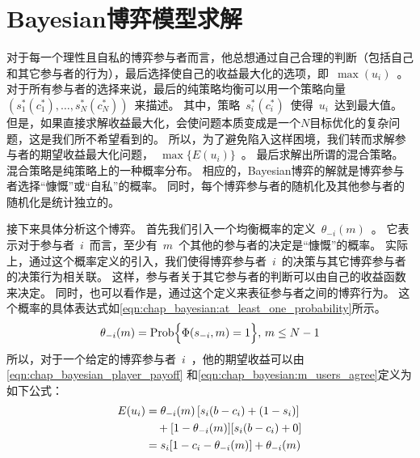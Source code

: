 %
\section{Bayesian博弈模型求解}
对于每一个理性且自私的博弈参与者而言，他总想通过自己合理的判断（包括自己和其它参与者的行为），最后选择使自己的收益最大化的选项，即~$\max(u_i)$~。
对于所有参与者的选择来说，最后的纯策略均衡可以用一个策略向量~$( s_1^*(c_1^*),\ldots, s_N^*(c_N^*) )$~来描述。
其中，策略~$s_i^*(c_i^*)$~使得~$u_i$~达到最大值。
但是，如果直接求解收益最大化，会使问题本质变成是一个$N$目标优化的复杂问题，这是我们所不希望看到的。
所以，为了避免陷入这样困境，我们转而求解参与者的期望收益最大化问题，~$\max\{E(u_i)\}$~。
最后求解出所谓的混合策略。混合策略是纯策略上的一种概率分布。
相应的，Bayesian博弈的解就是博弈参与者选择“慷慨”或“自私”的概率。
同时，每个博弈参与者的随机化及其他参与者的随机化是统计独立的。

接下来具体分析这个博弈。
首先我们引入一个均衡概率的定义~$\theta_{-i}(m)$~。
它表示对于参与者~$i$~而言，至少有~$m$~个其他的参与者的决定是“慷慨”的概率。
实际上，通过这个概率定义的引入，我们使得博弈参与者~$i$~的决策与其它博弈参与者的决策行为相关联。
这样，参与者关于其它参与者的判断可以由自己的收益函数来决定。
同时，也可以看作是，通过这个定义来表征参与者之间的博弈行为。
这个概率的具体表达式如\eqref{eqn:chap_bayesian:at_least_one_probability}所示。
\begin{equation}
    \theta_{-i}(m) = \hbox{Prob} \Bigl\{ \Phi( s_{-i},m) = 1 \Bigr\}, \, m\le N-1
    \label{eqn:chap_bayesian:at_least_one_probability} 
\end{equation}
所以，对于一个给定的博弈参与者~$i$~，他的期望收益可以由\eqref{eqn:chap_bayesian_player_payoff} 
和\eqref{eqn:chap_bayesian:m_users_agree}定义为如下公式：
\begin{align}
     E(u_i) &= \theta_{-i}(m)\left[s_i(b-c_i) +(1-s_i)\right] \notag \\
     & \quad + [1-\theta_{-i}(m)] [s_i(b-c_i) + 0] \notag\\ 
     &= s_i[1-c_i-\theta_{-i}(m)] + \theta_{-i}(m)
    \label{eqn:player_expe_payoff}
\end{align}

